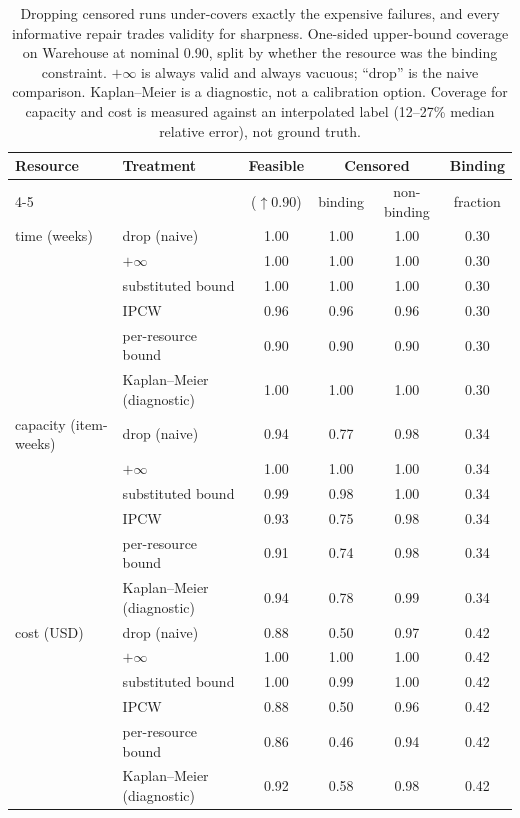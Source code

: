 \documentclass{article}
\begin{document}
\begin{table}[t]
  \caption{Dropping censored runs under-covers exactly the expensive failures, and
  every informative repair trades validity for sharpness. One-sided upper-bound
  coverage on Warehouse at nominal 0.90, split by whether the resource was the binding
  constraint. $+\infty$ is always valid and always vacuous; ``drop'' is the naive
  comparison. Kaplan--Meier is a diagnostic, not a calibration option. Coverage for capacity and cost is measured
  against an interpolated label (12--27\% median relative error), not ground truth.}
  \label{tab:b4}
  \centering
  \small
  \begin{tabular}{llcccc}
    \toprule
    Resource & Treatment & Feasible & \multicolumn{2}{c}{Censored} & Binding \\
    \cmidrule(lr){4-5}
     & & ($\uparrow$0.90) & binding & non-binding & fraction \\
    \midrule
    time (weeks) & drop (naive) & 1.00 & 1.00 & 1.00 & 0.30 \\
     & $+\infty$ & 1.00 & 1.00 & 1.00 & 0.30 \\
     & substituted bound & 1.00 & 1.00 & 1.00 & 0.30 \\
     & IPCW & 0.96 & 0.96 & 0.96 & 0.30 \\
     & per-resource bound & 0.90 & 0.90 & 0.90 & 0.30 \\
     & Kaplan--Meier (diagnostic) & 1.00 & 1.00 & 1.00 & 0.30 \\
    \midrule
    capacity (item-weeks) & drop (naive) & 0.94 & 0.77 & 0.98 & 0.34 \\
     & $+\infty$ & 1.00 & 1.00 & 1.00 & 0.34 \\
     & substituted bound & 0.99 & 0.98 & 1.00 & 0.34 \\
     & IPCW & 0.93 & 0.75 & 0.98 & 0.34 \\
     & per-resource bound & 0.91 & 0.74 & 0.98 & 0.34 \\
     & Kaplan--Meier (diagnostic) & 0.94 & 0.78 & 0.99 & 0.34 \\
    \midrule
    cost (USD) & drop (naive) & 0.88 & 0.50 & 0.97 & 0.42 \\
     & $+\infty$ & 1.00 & 1.00 & 1.00 & 0.42 \\
     & substituted bound & 1.00 & 0.99 & 1.00 & 0.42 \\
     & IPCW & 0.88 & 0.50 & 0.96 & 0.42 \\
     & per-resource bound & 0.86 & 0.46 & 0.94 & 0.42 \\
     & Kaplan--Meier (diagnostic) & 0.92 & 0.58 & 0.98 & 0.42 \\
    \bottomrule
  \end{tabular}
\end{table}
\end{document}
